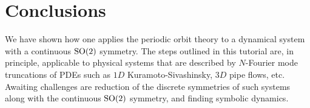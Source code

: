 \section{Conclusions}
\label{s:concl}

We have shown how one applies the periodic orbit theory to a dynamical
system with a continuous $\textrm{SO}(2)$ symmetry. The steps outlined in this
tutorial are, in principle, applicable to physical systems that are
described by $N$-Fourier mode truncations of PDEs such as $1D$
Kuramoto-Sivashinsky, $3D$ pipe flows, etc.
Awaiting challenges are reduction of the discrete symmetries of such
systems along with the continuous $\textrm{SO}(2)$ symmetry, and finding
symbolic dynamics.
